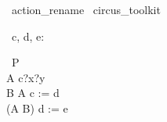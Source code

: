 \documentclass{article}
\begin{document}
\begin{zsection}
  \SECTION\ action\_rename \parents\ circus\_toolkit
\end{zsection}

\begin{circus}
   \circchannel\ c, d, e: \nat \cross \nat
\end{circus}

\begin{circus}
   \circprocess\ P \circdef \circbegin \\
        A \circdef c?x?y \then \Skip \\
        B \circdef A \lcircrename c := d \rcircrename \\
        \circspot (A \extchoice B) \lcircrename d := e \rcircrename \\
   \circend
\end{circus}
\end{document}
